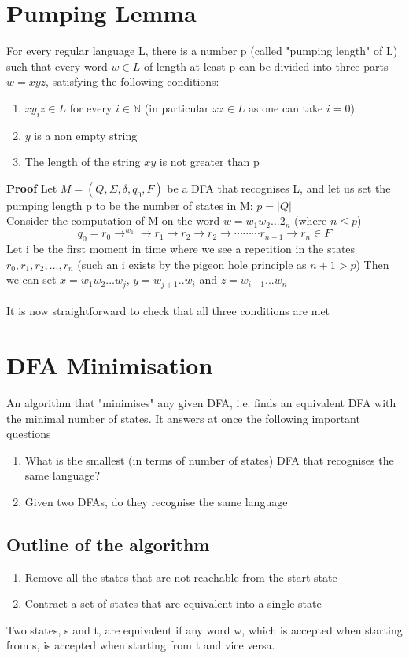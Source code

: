 \documentclass{article}[18pt]
\begin{document}
\section{Pumping Lemma}
For every regular language L, there is a number p (called "pumping length" of L) such that every word $w\in L$ of length at least p can be divided into three parts $w=xyz$, satisfying the following conditions:
\begin{enumerate}
	\item $xy_iz\in L$ for every $i\in \mathbb{N}$ (in particular $xz\in L$ as one can take $i=0$)
	\item $y$ is a non empty string
	\item The length of the string $xy$ is not greater than p
\end{enumerate}
\textbf{Proof} Let $M=(Q,\Sigma, \delta, q_0, F)$ be a DFA that recognises L, and let us set the pumping length p to be the number of states in M: $p=|Q|$\\
Consider the computation of M on the word $w=w_1w_2...2_n$ (where $n\leqslant p$)
\[
q_{0}=r_{0} \rightarrow^{w_{1}} \rightarrow r_{1} \rightarrow r_{2} \rightarrow r_{2} \rightarrow \cdots \cdots \cdots r_{n-1} \rightarrow r_{n} \in F
\]
Let i be the first moment in time where we see a repetition in the states $r_0,r_1,r_2,...,r_n$ (such an i exists by the pigeon hole principle as $n+1>p$) Then we can set $x=w_1w_2...w_j$, $y=w_{j+1}..w_i$ and $z=w_{i+1}...w_n$\\
\\
It is now straightforward to check that all three conditions are met
\section{DFA Minimisation}
An algorithm that "minimises" any given DFA, i.e. finds an equivalent DFA with the minimal number of states. It answers at once the following important questions
\begin{enumerate}
	\item What is the smallest (in terms of number of states) DFA that recognises the same language?
	\item Given two DFAs, do they recognise the same language
\end{enumerate}
\subsection{Outline of the algorithm}
\begin{enumerate}
	\item Remove all the states that are not reachable from the start state
	\item Contract a set of states that are equivalent into a single state
\end{enumerate}
Two states, s and t, are equivalent if any word w, which is accepted when starting from s, is accepted when starting from t and vice versa.
\end{document}
